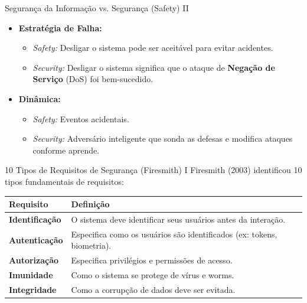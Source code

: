 \documentclass[aspectratio=169]{beamer}
\begin{document}
\begin{frame}{Segurança da Informação vs. Segurança (Safety) II}
    \begin{itemize}
        \item \textbf{Estratégia de Falha:} 
        \begin{itemize}
            \item \textit{Safety:} Desligar o sistema pode ser aceitável para evitar acidentes.
            \item \textit{Security:} Desligar o sistema significa que o ataque de \textbf{Negação de Serviço} (DoS) foi bem-sucedido.
        \end{itemize}
        \item \textbf{Dinâmica:} 
        \begin{itemize}
            \item \textit{Safety:} Eventos acidentais.
            \item \textit{Security:} Adversário inteligente que sonda as defesas e modifica ataques conforme aprende.
        \end{itemize}
    \end{itemize}
\end{frame}

\begin{frame}{10 Tipos de Requisitos de Segurança (Firesmith) I}
    Firesmith (2003) identificou 10 tipos fundamentais de requisitos:
    \centering
    \scriptsize
    \begin{tabular}{lp{10cm}}
        \hline
        \textbf{Requisito} & \textbf{Definição} \\
        \hline
        \textbf{Identificação} & O sistema deve identificar seus usuários antes da interação. \\
        \textbf{Autenticação} & Especifica como os usuários são identificados (ex: tokens, biometria). \\
        \textbf{Autorização} & Especifica privilégios e permissões de acesso. \\
        \textbf{Imunidade} & Como o sistema se protege de vírus e worms. \\
        \textbf{Integridade} & Como a corrupção de dados deve ser evitada. \\
        \hline
    \end{tabular}
\end{frame}
\end{document}
